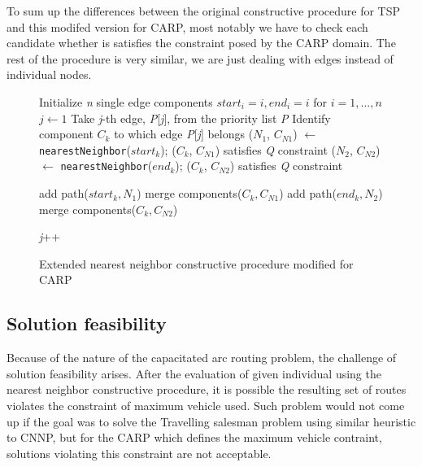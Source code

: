 \documentclass[twoside]{ctuthesis}
\theoremstyle{plain}
\theoremstyle{definition}
\theoremstyle{note}
\begin{document}
To sum up the differences between the original constructive procedure for TSP and this modifed version for CARP, most notably we have to check each candidate whether is satisfies the constraint posed by the CARP domain. The rest of the procedure is very similar, we are just dealing with edges instead of individual nodes.



	
\begin{figure}
\begin{algorithmic}[1]
	\State Initialize \emph{n} single edge components \emph{$ start_i = i, end_i = i $} for \emph{$ i = 1, ..., n $}
	\State $j \gets 1$
	\State Take \emph{j}-th edge, \emph{P}[\emph{j}], from the priority list \emph{P}
	\State Identify component \emph{$ C_k $} to which edge \emph{P}[\emph{j}] belongs
	\State (\emph{$N_1$}, \emph{$C_{N1}$}) $\gets$  {\tt nearestNeighbor}(\emph{$ start_k $}); (\emph{$ C_k $}, \emph{$C_{N1}$}) satisfies \emph{Q} constraint
	\State (\emph{$N_2$}, \emph{$C_{N2}$}) $\gets$  {\tt nearestNeighbor}(\emph{$ end_k $}); (\emph{$ C_k $}, \emph{$C_{N2}$}) satisfies \emph{Q} constraint
	
		\State add path(\emph{$ start_k, N_1 $})
		\State merge components(\emph{$C_k, C_{N1}$})
	\Else
		\State add path(\emph{$ end_k, N_2 $})
		\State merge components(\emph{$C_k, C_{N2}$})
	\EndIf
	
	\State \emph{j}++
	\EndWhile
	
	
\end{algorithmic}
	\caption{Extended nearest neighbor constructive procedure modified for CARP}
\label{fig:cnnpcarp}
\end{figure}


 

\subsection{Solution feasibility}
\label{sec:feasibility}
Because of the nature of the capacitated arc routing problem, the challenge of solution feasibility arises. After the evaluation of given individual using the nearest neighbor constructive procedure, it is possible the resulting set of routes violates the constraint of maximum vehicle used. Such problem would not come up if the goal was to solve the Travelling salesman problem using similar heuristic to CNNP, but for the CARP which defines the maximum vehicle contraint, solutions violating this constraint are not acceptable. 
\end{document}

